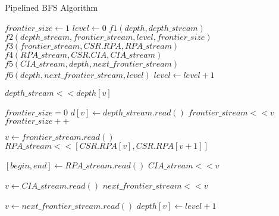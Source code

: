 \begin{algorithm}
	\caption{Pipelined BFS Algorithm} \label{alg:bfs-stream}
    \small
	\begin{algorithmic}[1]
        \State $frontier\_size \gets 1$
        \State $level \gets 0$
        \State $f1(depth, depth\_stream)$
        \State $f2(depth\_stream, frontier\_stream, level, frontier\_size)$ 
        \State $f3(frontier\_stream, CSR.RPA, RPA\_stream)$
        \State $f4(RPA\_stream, CSR.CIA, CIA\_stream)$ 
        \State $f5(CIA\_stream, depth, next\_frontier\_stream)$
        \State $f6(depth, next\_frontier\_stream, level)$
        \State $level \gets level + 1$
        \EndWhile
        \EndProcedure
        \State

        \State $depth\_stream << depth[v]$
        \EndFor
        \EndProcedure

        \State $frontier\_size = 0$
        \State $d[v] \gets depth\_stream.read()$
        \State $frontier\_stream << v$
        \State $frontier\_size++$
        \EndIf
        \EndFor
        \EndProcedure

        \State $v \gets frontier\_stream.read()$
        \State $RPA\_stream << [CSR.RPA[v], CSR.RPA[v+1]]$
        \EndWhile
        \EndProcedure

        \State $[begin, end] \gets RPA\_stream.read()$
        \State $CIA\_stream << v$
        \EndFor
        \EndWhile
        \EndProcedure

        \State $v \gets CIA\_stream.read()$
        \State $next\_frontier\_stream << v$
        \EndIf
        \EndWhile
        \EndProcedure

        \State $v \gets next\_frontier\_stream.read()$
        \State $depth[v] \gets level + 1$
        \EndWhile
        \EndProcedure

    \end{algorithmic}
\end{algorithm}

